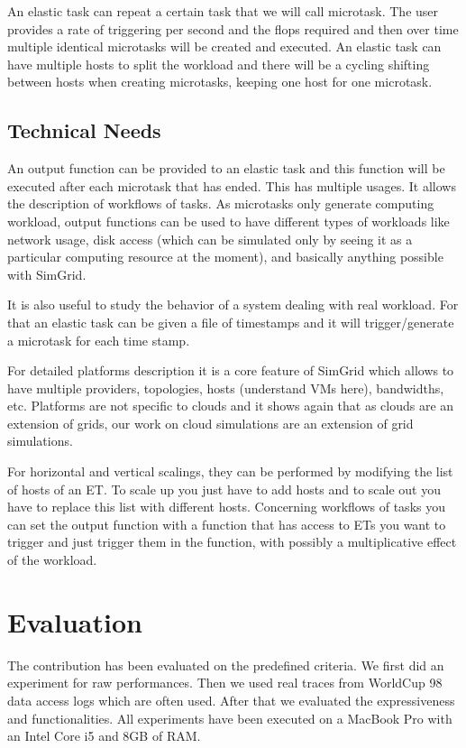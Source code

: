 \documentclass[a4paper, onecolumn, 11pt]{article}
\begin{document}
  An elastic task can repeat a certain task that we will call microtask. The 
  user provides a rate of triggering per second and the flops required and then 
  over time multiple identical microtasks will be created and executed. An 
  elastic task can have multiple hosts to split the workload and there will be 
  a cycling shifting between hosts when creating microtasks, keeping one host 
  for one microtask.
  
  \subsection{Technical Needs}
  An output function can be provided to an elastic task and this function will 
  be executed after each microtask that has ended. This has multiple usages. It 
  allows the description of workflows of tasks. As microtasks only generate 
  computing workload, output functions can be used to have different types of 
  workloads like network usage, disk access (which can be simulated only by 
  seeing it as a particular computing resource at the moment), and basically 
  anything possible with SimGrid.
  
  It is also useful to study the behavior of a system dealing with real 
  workload. For that an elastic task can be given a file of timestamps and it 
  will trigger/generate a microtask for each time stamp.
  
  For detailed platforms description it is a core feature of SimGrid which 
  allows to have multiple providers, topologies, hosts (understand VMs here), 
  bandwidths, etc. Platforms are not specific to clouds and it shows again that 
  as clouds are an extension of grids, our work on cloud simulations are an 
  extension of grid simulations.
  
  For horizontal and vertical scalings, they can be performed by modifying the
  list of hosts of an ET. To scale up you just have to add hosts and to scale
  out you have to replace this list with different hosts. Concerning workflows
  of tasks you can set the output function with a function that has access to
  ETs you want to trigger and just trigger them in the function, with possibly
  a multiplicative effect of the workload.


\section{Evaluation} \label{eval}
  The contribution has been evaluated on the predefined criteria. We first did 
  an experiment for raw performances. Then we used real traces from WorldCup 98 
  data access logs \cite{wc98} which are often used. After that we evaluated 
  the expressiveness and functionalities. All experiments have been executed on 
  a MacBook Pro with an Intel Core i5 and 8GB of RAM.
    
\end{document}
